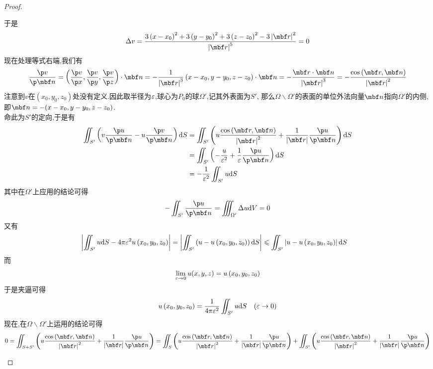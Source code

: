 \documentclass{ctexart}
\begin{document}
\begin{proof}
\begin{enumerate}[label=\tbf{(\arabic*)}]
            于是
            \[\Delta v=\dfrac{3\left(x-x_0\right)^2+3\left(y-y_0\right)^2+3\left(z-z_0\right)^2-3\left|\mbf r\right|^2}{\left|\mbf r\right|^5}=0\]
            现在处理等式右端,我们有
            \[\dfrac{\p v}{\p\mbf n}=\left(\dfrac{\p v}{\p x},\dfrac{\p v}{\p y},\dfrac{\p v}{\p z}\right)\cdot\mbf n
            =-\dfrac{1}{\left|\mbf r\right|^3}\left(x-x_0,y-y_0,z-z_0\right)\cdot\mbf n=-\dfrac{\mbf r\cdot\mbf n}{\left|\mbf r\right|^3}
            =-\dfrac{\cos\left(\mbf r,\mbf n\right)}{\left|\mbf r\right|^2}\]
            注意到$v$在$\left(x_0,y_0,z_0\right)$处没有定义.因此取半径为$\varepsilon$,球心为$P_0$的球$\Omega'$,记其外表面为$S'$,%
            那么$\Omega\backslash\Omega'$的表面的单位外法向量$\mbf n$指向$\Omega'$的内侧,即$\mbf n=-(x-x_0,y-y_0,z-z_0)$.\\
            命此为$S'$的定向,于是有
            \[\begin{aligned}
                \iint_{S'}\left(v\dfrac{\p u}{\p\mbf n}-u\dfrac{\p v}{\p\mbf n}\right)\di S
                &= \iint_{S'}\left(u\dfrac{\cos\left(\mbf r,\mbf n\right)}{\left|\mbf r\right|^2}+\dfrac{1}{\left|\mbf r\right|}\dfrac{\p u}{\p\mbf n}\right)\di S \\
                &= \iint_{S'}\left(-\dfrac{u}{\ep^2}+\dfrac{1}{\ep}\dfrac{\p u}{\p\mbf n}\right)\di S \\
                &= -\dfrac{1}{\ep^2}\iint_{S'}u\di S\\
            \end{aligned}\]
            其中在$\Omega'$上应用的结论可得
            \[-\iint_{S'}\dfrac{\p u}{\p\mbf n}=\iiint_{\Omega'}\Delta u\di V=0\]
            又有
            \[\begin{aligned}
                \left|\iint_{S'}u\mathrm{d} S-4\pi\varepsilon^2u\left(x_0,y_0,z_0\right)\right|
                &= \left|\iint_{S'}\left(u-u\left(x_0,y_0,z_0\right)\right)\mathrm{d} S\right|
                \leqslant\iint_{S'}\left|u-u\left(x_0,y_0,z_0\right)\right|\mathrm{d} S
            \end{aligned}\]
            而
            \[\lim_{\varepsilon\to0}u(x,y,z)=u\left(x_0,y_0,z_0\right)\]
            于是夹逼可得
            \[u\left(x_0,y_0,z_0\right)=\dfrac{1}{4\pi\varepsilon^2}\iint_{S'}u\mathrm{d} S\ \ \ (\varepsilon\to0)\]
            现在,在$\Omega\backslash\Omega'$上运用的结论可得
            \[0=\iint_{S+S'}\left(u\dfrac{\cos\left(\mbf r,\mbf n\right)}{\left|\mbf r\right|^2}+\dfrac{1}{\left|\mbf r\right|}\dfrac{\p u}{\p\mbf n}\right)
            =\iint_S\left(u\dfrac{\cos\left(\mbf r,\mbf n\right)}{\left|\mbf r\right|^2}+\dfrac{1}{\left|\mbf r\right|}\dfrac{\p u}{\p\mbf n}\right)+\iint_{S'}\left(u\dfrac{\cos\left(\mbf r,\mbf n\right)}{\left|\mbf r\right|^2}+\dfrac{1}{\left|\mbf r\right|}\dfrac{\p u}{\p\mbf n}\right)\]

\end{enumerate}
\end{proof}
\end{document}
